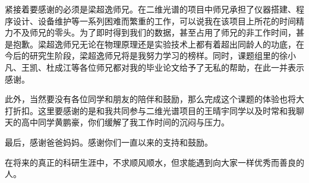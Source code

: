 \documentclass{thesis}
\begin{document}
紧接着要感谢的必须是梁超逸师兄。在二维光谱的项目中师兄承担了仪器搭建、程序设计、设备维护等一系列困难而繁重的工作，可以说我在该项目上所花的时间精力不及师兄的零头。为了即时得到我们的数据，甚至占用了师兄的非工作时间，甚是抱歉。梁超逸师兄无论在物理原理还是实验技术上都有着超出同龄人的功底，在今后的研究生阶段，梁超逸师兄将是我努力学习的榜样。同时，课题组里的徐小凡、王凯、杜成江等各位师兄都对我的毕业论文给予了无私的帮助，在此一并表示感谢。

此外，当然要没有各位同学和朋友的陪伴和鼓励，那么完成这个课题的体验也将大打折扣。这里要感谢的是和我共同参与二维光谱项目的王晴宇同学以及时常和我聊天的高中同学黄鹏豪，你们缓解了我工作时间的沉闷与压力。

最后，感谢爸爸妈妈。感谢你们一直以来的支持和鼓励。

在将来的真正的科研生涯中，不求顺风顺水，但求能遇到向大家一样优秀而善良的人。
\end{document}
